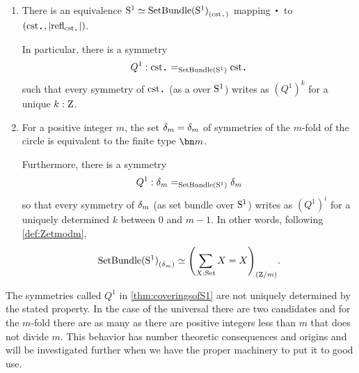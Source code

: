 \begin{theorem}~%
  \label{thm:coveringsofS1}
  \begin{enumerate}
  \item \label{item:univ-cover-Sc-Z}%
    There is an equivalence
    $\Sc \weq \conncomp {\SetBundle(\Sc)} {\cst \base}$ mapping
    $\base$ to $(\cst \base, \trunc{\refl {\cst \base}})$.

    In particular, there is a symmetry
    \[
      Q^1:\cst\base=_{\SetBundle(\Sc)}\cst\base
    \]
    such that every symmetry of $\cst\base$
    (as a \covering over ${\mathrm{S}^1}$)
    writes as $(Q^1)^k$ for a unique $k:\mathrm{Z}$.

  \item \label{item:setbundle-mcover}%
    For a positive integer $m$, the set
    $\dg{m}=\dg{m}$ of symmetries of the
    $m$-fold \covering of the circle is equivalent to the finite type
    $\bn m$.

    Furthermore, there is a symmetry
    \begin{displaymath}
      Q^1:\dg{m}=_{\SetBundle(\Sc)}\dg{m}
    \end{displaymath}
    so that every symmetry of $\dg{m}$ (as set bundle over
    ${\mathrm{S}^1}$) writes as $(Q^1)^i$ for a uniquely determined $k$ between
    $0$ and $m-1$. In other words, following \cref{def:Zetmodm},
    \begin{displaymath}
      \conncomp{\SetBundle(\Sc)}{\dg{m}} \weq \conncomp{\left(\sum_{X:\Set}X=X\right)}{\zet/m}.
    \end{displaymath}

  \end{enumerate}
 \end{theorem}
\begin{remark}\label{rem:thenonuniquenessofgeneratorsofmodulararithmetic1}
  The symmetries called $Q^1$ in \cref{thm:coveringsofS1} are not
  uniquely determined by the stated property.  In the case of the
  universal \covering there are two candidates and for the $m$-fold
  \covering there are as many as there are positive integers less than
  $m$ that does not divide $m$.  This behavior has number theoretic
  consequences and origins and will be investigated further when we
  have the proper machinery to put it to good use.
\end{remark}

